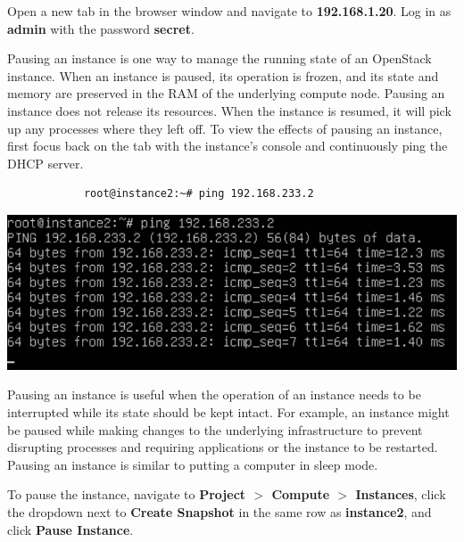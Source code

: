 \documentclass[letterpaper, 12pt]{article}
\begin{document}
\begin{enumerate}
    \begin{labstep}
        Open a new tab in the browser window and navigate to \textbf{192.168.1.20}.
        Log in as \textbf{admin} with the password \textbf{secret}.
    \end{labstep}

    \begin{labstep}
        Pausing an instance is one way to manage the running state of an OpenStack instance.
        When an instance is paused, its operation is frozen, and its state and memory are preserved in the RAM of the underlying compute node.
        Pausing an instance does not release its resources.
        When the instance is resumed, it will pick up any processes where they left off.
        To view the effects of pausing an instance, first focus back on the tab with the instance's console and continuously ping the DHCP server.
        \begin{lstlisting}
            root@instance2:~# ping 192.168.233.2
        \end{lstlisting}

        \begin{center}
            \includegraphics[width=\linewidth]{images/part3/step2.png}
        \end{center}
    \end{labstep}

    \begin{tipbox}
        Pausing an instance is useful when the operation of an instance needs to be interrupted while its state should be kept intact.
        For example, an instance might be paused while making changes to the underlying infrastructure to prevent disrupting processes and requiring applications or the instance to be restarted.
        Pausing an instance is similar to putting a computer in sleep mode.
    \end{tipbox}

    \begin{labstep}
        To pause the instance, navigate to \textbf{Project $>$ Compute $>$ Instances}, click the dropdown next to \textbf{Create Snapshot} in the same row as \textbf{instance2}, and click \textbf{Pause Instance}.


\end{labstep}
\end{enumerate}
\end{document}
